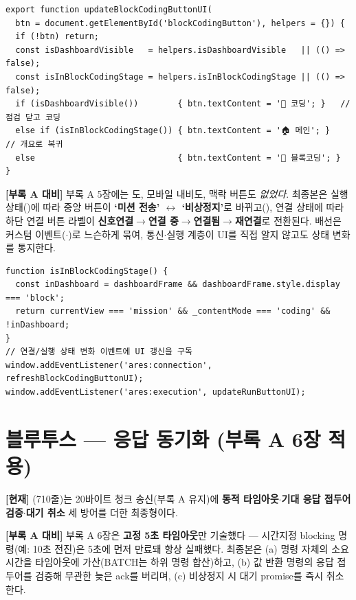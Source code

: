 \begin{verbatim}
export function updateBlockCodingButtonUI(
  btn = document.getElementById('blockCodingButton'), helpers = {}) {
  if (!btn) return;
  const isDashboardVisible   = helpers.isDashboardVisible   || (() => false);
  const isInBlockCodingStage = helpers.isInBlockCodingStage || (() => false);
  if (isDashboardVisible())        { btn.textContent = '🧩 코딩'; }   // 점검 닫고 코딩
  else if (isInBlockCodingStage()) { btn.textContent = '🏠 메인'; }   // 개요로 복귀
  else                             { btn.textContent = '🧩 블록코딩'; }
}
\end{verbatim}

\smallskip
\noindent\textbf{[부록 A 대비]} 부록 A 5장에는 도, 모바일 내비도, 맥락 버튼도
\emph{없었다}. 최종본은 실행 상태()에 따라 중앙 버튼이 \textbf{`미션 전송'
$\leftrightarrow$ `비상정지'}로 바뀌고(), 연결 상태에 따라 하단 연결
버튼 라벨이 \textbf{신호연결$\to$연결 중$\to$연결됨$\to$재연결}로 전환된다. 배선은 커스텀
이벤트($\cdot$)로 느슨하게 묶여, 통신$\cdot$실행 계층이
UI를 직접 알지 않고도 상태 변화를 통지한다.

\begin{verbatim}
function isInBlockCodingStage() {
  const inDashboard = dashboardFrame && dashboardFrame.style.display === 'block';
  return currentView === 'mission' && _contentMode === 'coding' && !inDashboard;
}
// 연결/실행 상태 변화 이벤트에 UI 갱신을 구독
window.addEventListener('ares:connection', refreshBlockCodingButtonUI);
window.addEventListener('ares:execution', updateRunButtonUI);
\end{verbatim}

\section{블루투스 --- 응답 동기화 (부록 A 6장 적용)}
\textbf{[현재]} (710줄)는 20바이트 청크 송신(부록 A 유지)에 \textbf{동적
타임아웃$\cdot$기대 응답 접두어 검증$\cdot$대기 취소} 세 방어를 더한 최종형이다.

\smallskip
\noindent\textbf{[부록 A 대비]} 부록 A 6장은 \textbf{고정 5초 타임아웃}만 기술했다 --- 시간지정
blocking 명령(예: 10초 전진)은 5초에 먼저 만료돼 항상 실패했다. 최종본은 (a) 명령 자체의
소요시간을 타임아웃에 가산(BATCH는 하위 명령 합산)하고, (b) 값 반환 명령의 응답 접두어를
검증해 무관한 늦은 ack를 버리며, (c) 비상정지 시 대기 promise를 즉시 취소한다.

